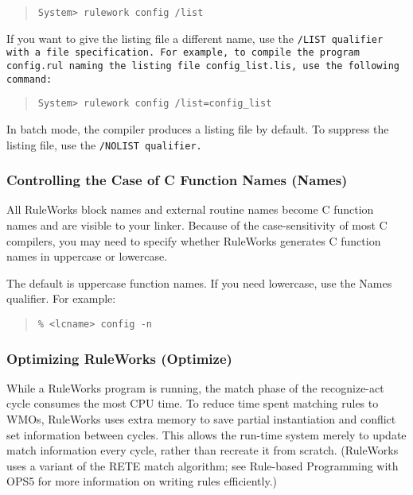 \begin{quote}
\begin{verbatim}
System> rulework config /list
\end{verbatim}
\end{quote}  

If you want to give the listing file a different name, use the
\tt{/LIST} qualifier with a file specification. For example, to
compile the program \tt{config.rul} naming the listing file
\verb|config_list.lis|, use the following command:

\begin{quote}
\begin{verbatim}
System> rulework config /list=config_list
\end{verbatim}
\end{quote}  

In batch mode, the compiler produces a listing file by default. To
suppress the listing file, use the \tt{/NOLIST} qualifier.

\subsubsection{Controlling the Case of C Function Names (Names)}

All RuleWorks block names and external routine names become C function
names and are visible to your linker.  Because of the case-sensitivity
of most C compilers, you may need to specify whether RuleWorks
generates C function names in uppercase or lowercase.

The default is uppercase function names. If you need lowercase, use
the Names qualifier. For example:

\begin{quote}
\begin{verbatim}
% <lcname> config -n
\end{verbatim}
\end{quote}

\subsubsection{Optimizing RuleWorks (Optimize)}

While a RuleWorks program is running, the match phase of the
recognize-act cycle consumes the most CPU time. To reduce time spent
matching rules to WMOs, RuleWorks uses extra memory to save partial
instantiation and conflict set information between cycles. This allows
the run-time system merely to update match information every cycle,
rather than recreate it from scratch. (RuleWorks uses a variant of the
RETE match algorithm; see Rule-based Programming with OPS5 for more
information on writing rules efficiently.)

